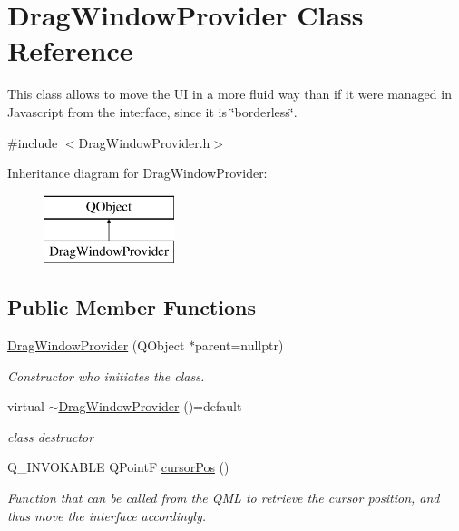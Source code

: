 \hypertarget{class_drag_window_provider}{}\section{Drag\+Window\+Provider Class Reference}
\label{class_drag_window_provider}


This class allows to move the UI in a more fluid way than if it were managed in Javascript from the interface, since it is \char`\"{}borderless\char`\"{}.  




{\ttfamily \#include $<$Drag\+Window\+Provider.\+h$>$}

Inheritance diagram for Drag\+Window\+Provider\+:\begin{figure}[H]
\begin{center}
\leavevmode
\includegraphics[height=2.000000cm]{class_drag_window_provider}
\end{center}
\end{figure}
\subsection*{Public Member Functions}
\begin{DoxyCompactItemize}
\item 
\hyperlink{class_drag_window_provider_a88a5de51a4d78749e8eab5b6b59c8476}{Drag\+Window\+Provider} (Q\+Object $\ast$parent=nullptr)
\begin{DoxyCompactList}\small\item\em Constructor who initiates the class. \end{DoxyCompactList}\item 
virtual \hyperlink{class_drag_window_provider_ac0f6baa106cba68b048a14a61cd7919b}{$\sim$\+Drag\+Window\+Provider} ()=default
\begin{DoxyCompactList}\small\item\em class destructor \end{DoxyCompactList}\item 
Q\+\_\+\+I\+N\+V\+O\+K\+A\+B\+LE Q\+PointF \hyperlink{class_drag_window_provider_ab55b2847cd09565bd080e16e144f7d24}{cursor\+Pos} ()
\begin{DoxyCompactList}\small\item\em Function that can be called from the Q\+ML to retrieve the cursor position, and thus move the interface accordingly. \end{DoxyCompactList}\end{DoxyCompactItemize}


